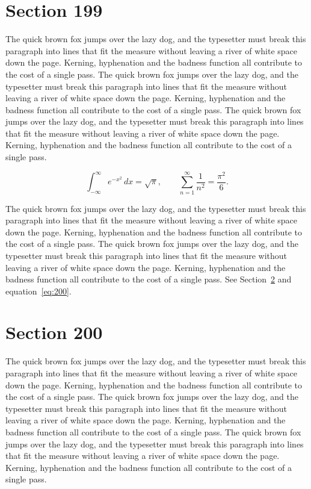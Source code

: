 \documentclass{article}
\begin{document}
\section{Section 199}
\label{sec:199}
The quick brown fox jumps over the lazy dog, and the typesetter must break this paragraph into lines that fit the measure without leaving a river of white space down the page. Kerning, hyphenation and the badness function all contribute to the cost of a single pass. The quick brown fox jumps over the lazy dog, and the typesetter must break this paragraph into lines that fit the measure without leaving a river of white space down the page. Kerning, hyphenation and the badness function all contribute to the cost of a single pass. The quick brown fox jumps over the lazy dog, and the typesetter must break this paragraph into lines that fit the measure without leaving a river of white space down the page. Kerning, hyphenation and the badness function all contribute to the cost of a single pass. 

\begin{equation}\label{eq:199}
\int_{-\infty}^{\infty} e^{-x^{2}}\,dx = \sqrt{\pi}, \qquad
\sum_{n=1}^{\infty} \frac{1}{n^{2}} = \frac{\pi^{2}}{6}.
\end{equation}

The quick brown fox jumps over the lazy dog, and the typesetter must break this paragraph into lines that fit the measure without leaving a river of white space down the page. Kerning, hyphenation and the badness function all contribute to the cost of a single pass. The quick brown fox jumps over the lazy dog, and the typesetter must break this paragraph into lines that fit the measure without leaving a river of white space down the page. Kerning, hyphenation and the badness function all contribute to the cost of a single pass. 
See Section~\ref{sec:200} and equation~\eqref{eq:200}.
\section{Section 200}
\label{sec:200}
The quick brown fox jumps over the lazy dog, and the typesetter must break this paragraph into lines that fit the measure without leaving a river of white space down the page. Kerning, hyphenation and the badness function all contribute to the cost of a single pass. The quick brown fox jumps over the lazy dog, and the typesetter must break this paragraph into lines that fit the measure without leaving a river of white space down the page. Kerning, hyphenation and the badness function all contribute to the cost of a single pass. The quick brown fox jumps over the lazy dog, and the typesetter must break this paragraph into lines that fit the measure without leaving a river of white space down the page. Kerning, hyphenation and the badness function all contribute to the cost of a single pass. 
\end{document}
